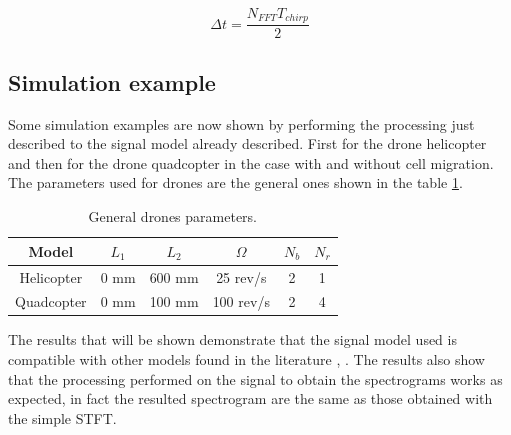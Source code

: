 \begin{equation}
\Delta t = \frac{N_{FFT}T_{chirp}}{2}
\label{timeresstft}
\end{equation}

\subsection{Simulation example}

Some simulation examples are now shown by performing the processing just described to the signal model already described. First for the drone helicopter and then for the drone quadcopter in the case with and without cell migration. The parameters used for drones are the general ones shown in the table \ref{tab:generaldroneparams}.

\begin{table}[h!]
\centering
\begin{tabular}{|c|c|c|c|c|c|}
\hline
{\color[HTML]{000000} Model} & {\color[HTML]{000000} $L_1$} & {\color[HTML]{000000} $L_2$} & {\color[HTML]{000000} $\Omega$} & {\color[HTML]{000000} $N_b$} & {\color[HTML]{000000} $N_r$} \\ \hline
{\color[HTML]{000000} Helicopter} & {\color[HTML]{000000} 0 mm} & {\color[HTML]{000000} 600 mm} & {\color[HTML]{000000} 25 rev/s} & {\color[HTML]{000000} 2} & {\color[HTML]{000000} 1} \\ \hline
{\color[HTML]{000000} Quadcopter} & {\color[HTML]{000000} 0 mm} & {\color[HTML]{000000} 100 mm} & {\color[HTML]{000000} 100 rev/s} & {\color[HTML]{000000} 2} & {\color[HTML]{000000} 4} \\ \hline
\end{tabular}
\caption{General drones parameters. }
\label{tab:generaldroneparams}
\end{table}

The results that will be shown demonstrate that the signal model used is compatible with other models found in the literature \cite{microdoppler_chen}, \cite{kulpa}. The results also show that the processing performed on the signal to obtain the spectrograms works as expected, in fact the resulted spectrogram are the same as those obtained with the simple STFT.

